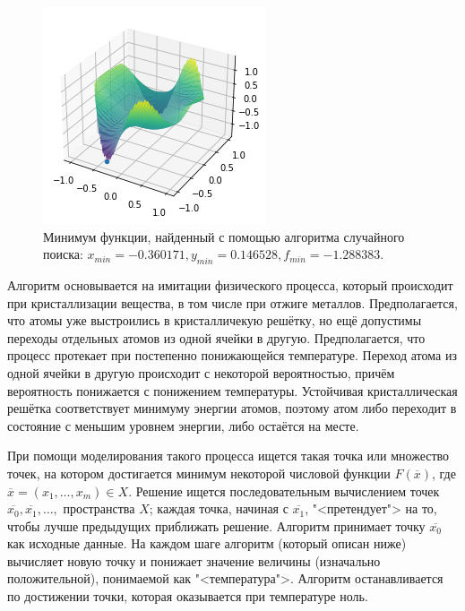 \begin{figure}[ht]
	\centering
	\includegraphics[width = 0.5\linewidth]{"./resources/random_min.png"}
	\caption{Минимум функции, найденный с помощью алгоритма случайного 
     поиска: \( x_{min} = -0.360171, y_{min} = 0.146528, f_{min} = -1.288383. \)}
    \label{fig:random_min}
\end{figure}


Алгоритм основывается на имитации физического процесса, который происходит
 при кристаллизации вещества, в том числе при отжиге металлов. Предполагается,
 что атомы уже выстроились в кристалличекую решётку, но ещё допустимы переходы
 отдельных атомов из одной ячейки в другую. Предполагается, что процесс
 протекает при постепенно понижающейся температуре. Переход атома из одной 
 ячейки в другую происходит с некоторой вероятностью, причём вероятность 
 понижается с понижением температуры. Устойчивая кристаллическая решётка 
 соответствует минимуму энергии атомов, поэтому атом либо переходит в 
 состояние с меньшим уровнем энергии, либо остаётся на месте.

При помощи моделирования такого процесса ищется такая точка или множество 
 точек, на котором достигается минимум некоторой числовой функции 
 \( F(\overline{x}) \), где \( \overline{x}=(x_{1}, \dots,x_{m}) \in X \).
 Решение ищется последовательным вычислением точек \( \overline{x_0}, 
 \overline{x_1}, \dots, \) пространства \( X \); каждая точка, начиная с
 \( \overline{x_{1}} \), "<претендует"> на то, чтобы лучше предыдущих
 приближать решение. Алгоритм принимает точку \( \overline{x_{0}} \) как 
 исходные данные. На каждом шаге алгоритм (который описан ниже) вычисляет 
 новую точку и понижает значение величины (изначально положительной), 
 понимаемой как "<температура">. Алгоритм останавливается по достижении 
 точки, которая оказывается при температуре ноль.

